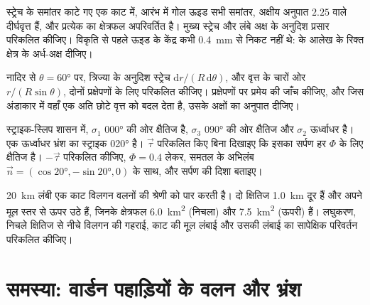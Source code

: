 \begin{exercise}[$\star\star$]\label{exo:b3:structural-analysis:9}
स्ट्रेच के समांतर काटे गए एक काट में, आरंभ में गोल ऊइड
सभी समांतर, अक्षीय अनुपात $2.25$ वाले दीर्घवृत्त हैं, और प्रत्येक का क्षेत्रफल
अपरिवर्तित है। मुख्य स्ट्रेच और लंबे
अक्ष के अनुदिश प्रसार परिकलित कीजिए। विकृति से पहले ऊइड के केंद्र कभी
\qty{0.4}{mm} से निकट नहीं थे:  के आलेख के रिक्त क्षेत्र के अर्ध-अक्ष दीजिए।
\end{exercise}

\begin{exercise}[$\star\star\star$]\label{exo:b3:structural-analysis:10}
नादिर से $\theta = \ang{60}$ पर, त्रिज्या के अनुदिश स्ट्रेच
$\mathrm dr/(R\,\mathrm d\theta)$, और वृत्त के चारों ओर $r/(R\sin\theta)$,
दोनों प्रक्षेपणों के लिए परिकलित कीजिए। प्रक्षेपणों पर प्रमेय की जाँच कीजिए, और जिस अंडाकार में
 वहाँ एक अति छोटे वृत्त को बदल देता है, उसके अक्षों का
अनुपात दीजिए।
\end{exercise}

\begin{exercise}[$\star\star\star$]\label{exo:b3:structural-analysis:11}
स्ट्राइक-स्लिप शासन में, $\sigma_1$ \ang{000} की ओर क्षैतिज है,
$\sigma_3$ \ang{090} की ओर क्षैतिज और $\sigma_2$ ऊर्ध्वाधर है। एक ऊर्ध्वाधर
भ्रंश का स्ट्राइक \ang{020} है। $\vec\tau$ परिकलित किए बिना दिखाइए कि इसका सर्पण
हर $\Phi$ के लिए क्षैतिज है। $-\vec\tau$ परिकलित कीजिए, $\Phi = 0.4$ लेकर,
समतल के अभिलंब $\vec n = (\cos\ang{20}, -\sin\ang{20}, 0)$ के साथ, और
सर्पण की दिशा बताइए।
\end{exercise}

\begin{exercise}[$\star\star\star$]\label{exo:b3:structural-analysis:12}
\qty{20}{km} लंबी एक काट विलगन वलनों की श्रेणी को पार करती है। दो क्षितिज
\qty{1.0}{km} दूर हैं और अपने मूल स्तर से ऊपर उठे हैं, जिनके क्षेत्रफल
\qty{6.0}{km^2} (निचला) और \qty{7.5}{km^2} (ऊपरी) हैं। लघुकरण,
निचले क्षितिज से नीचे विलगन की गहराई, काट की मूल लंबाई
और उसकी लंबाई का सापेक्षिक परिवर्तन परिकलित कीजिए।
\end{exercise}

\section{समस्या: वार्डन पहाड़ियों के वलन और भ्रंश}


